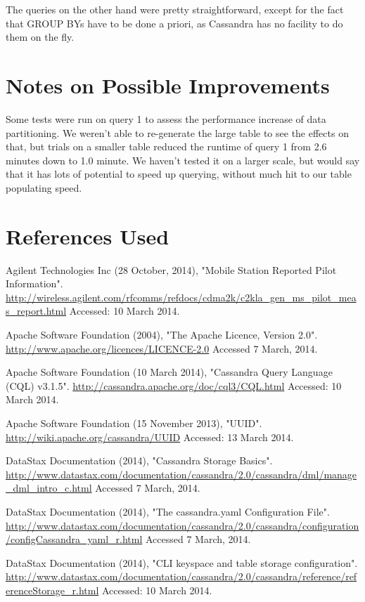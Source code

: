 \documentclass[letterpaper]{article}
\begin{document}
The queries on the other hand were pretty straightforward, except for the fact
that GROUP BYs have to be done a priori, as Cassandra has no facility to do
them on the fly.

\section{Notes on Possible Improvements}

Some tests were run on query 1 to assess the performance increase of data
partitioning. We weren't able to re-generate the large table to see the effects
on that, but trials on a smaller table reduced the runtime of query 1 from 2.6
minutes down to 1.0 minute. We haven't tested it on a larger scale, but would
say that it has lots of potential to speed up querying, without much hit to our
table populating speed.

\section{References Used}

Agilent Technologies Inc (28 October, 2014), "Mobile Station Reported Pilot Information".
\url{http://wireless.agilent.com/rfcomms/refdocs/cdma2k/c2kla_gen_ms_pilot_meas_report.html}
Accessed: 10 March 2014.

Apache Software Foundation (2004), "The Apache Licence, Version 2.0".
\url{http://www.apache.org/licences/LICENCE-2.0}
Accessed 7 March, 2014.

Apache Software Foundation (10 March 2014), "Cassandra Query Language (CQL) v3.1.5".
\url{http://cassandra.apache.org/doc/cql3/CQL.html}
Accessed: 10 March 2014.


Apache Software Foundation (15 November 2013), "UUID".
\url{http://wiki.apache.org/cassandra/UUID}
Accessed: 13 March 2014.


DataStax Documentation (2014), "Cassandra Storage Basics".
\url{http://www.datastax.com/documentation/cassandra/2.0/cassandra/dml/manage_dml_intro_c.html}
Accessed 7 March, 2014.

DataStax Documentation (2014), "The cassandra.yaml Configuration File".
\url{http://www.datastax.com/documentation/cassandra/2.0/cassandra/configuration/configCassandra_yaml_r.html}
Accessed 7 March, 2014.  

DataStax Documentation (2014), "CLI keyspace and table storage configuration".
\url{http://www.datastax.com/documentation/cassandra/2.0/cassandra/reference/referenceStorage_r.html}
Accessed: 10 March 2014.
\end{document}
